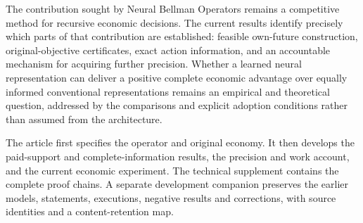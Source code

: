 The contribution sought by Neural Bellman Operators remains a competitive
method for recursive economic decisions. The current results identify
precisely which parts of that contribution are established: feasible
own-future construction, original-objective certificates, exact action
information, and an accountable mechanism for acquiring further precision.
Whether a learned neural representation can deliver a positive complete
economic advantage over equally informed conventional representations
remains an empirical and theoretical question, addressed by the comparisons
and explicit adoption conditions rather than assumed from the architecture.

The article first specifies the operator and original economy. It then
develops the paid-support and complete-information results, the precision
and work account, and the current economic experiment. The technical
supplement contains the complete proof chains. A separate development
companion preserves the earlier models, statements, executions, negative
results and corrections, with source identities and a content-retention map.

